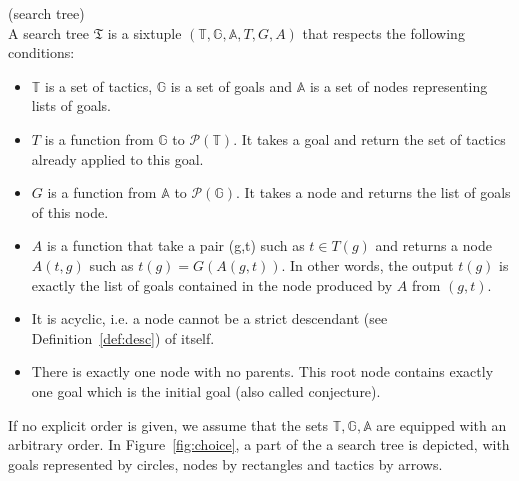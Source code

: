 \documentclass[runningheads,a4paper,draft]{svjour3}
\begin{document}
\begin{definition}\label{def:stree}(search tree)\\
A search tree $\mathfrak{T}$ is a sixtuple
$(\mathbb{T},\mathbb{G},\mathbb{A},T,G,A)$
that respects the following conditions:
\begin{itemize}
\item $\mathbb{T}$ is a set of tactics, $\mathbb{G}$ is a set of goals
 and $\mathbb{A}$ is a set of nodes representing lists of goals.
\item $T$ is a function from $\mathbb{G}$ to $\mathcal{P}(\mathbb{T})$. It
takes a goal and return the set of tactics already applied to this goal.
\item $G$ is a function from $\mathbb{A}$ to $\mathcal{P}(\mathbb{G})$.
It takes a node and returns the list of goals of this node.
\item $A$ is a function that take a pair (g,t) such as $t \in T(g)$ and returns 
a node $A(t,g)$ such as $t(g) = G(A(g,t))$. In other words, the output $t(g)$ 
is exactly the list of goals contained in the node produced by $A$ from $(g,t)$.
\item It is acyclic, i.e. a node cannot be a strict descendant (see 
Definition~\ref{def:desc}) of itself.
\item There is exactly one node with no parents. This root node contains 
exactly one goal which is the initial goal (also called conjecture).
\end{itemize}

\end{definition}

If no explicit order is given, we assume that the sets
$\mathbb{T},\mathbb{G},\mathbb{A}$ are equipped with an
arbitrary order. In Figure~\ref{fig:choice}, a part of the a search tree is
depicted, with goals represented by circles, nodes by rectangles and tactics by
arrows.
\end{document}
